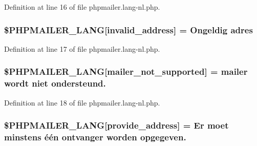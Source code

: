 Definition at line 16 of file phpmailer.\+lang-\/nl.\+php.

\subsubsection[{\texorpdfstring{\$\+P\+H\+P\+M\+A\+I\+L\+E\+R\+\_\+\+L\+A\+NG}{$PHPMAILER_LANG}}]{\setlength{\rightskip}{0pt plus 5cm}\$P\+H\+P\+M\+A\+I\+L\+E\+R\+\_\+\+L\+A\+NG\mbox{[}\textquotesingle{}invalid\+\_\+address\textquotesingle{}\mbox{]} = \textquotesingle{}Ongeldig adres\textquotesingle{}}\hypertarget{phpmailer_8lang-nl_8php_a42d61bcea4c79599ecb44fd062f54d47}{}\label{phpmailer_8lang-nl_8php_a42d61bcea4c79599ecb44fd062f54d47}


Definition at line 17 of file phpmailer.\+lang-\/nl.\+php.

\subsubsection[{\texorpdfstring{\$\+P\+H\+P\+M\+A\+I\+L\+E\+R\+\_\+\+L\+A\+NG}{$PHPMAILER_LANG}}]{\setlength{\rightskip}{0pt plus 5cm}\$P\+H\+P\+M\+A\+I\+L\+E\+R\+\_\+\+L\+A\+NG\mbox{[}\textquotesingle{}mailer\+\_\+not\+\_\+supported\textquotesingle{}\mbox{]} = \textquotesingle{} mailer wordt niet ondersteund.\textquotesingle{}}\hypertarget{phpmailer_8lang-nl_8php_aa2ebcb8833ee83a7ad67401c4bb3a6ad}{}\label{phpmailer_8lang-nl_8php_aa2ebcb8833ee83a7ad67401c4bb3a6ad}


Definition at line 18 of file phpmailer.\+lang-\/nl.\+php.

\subsubsection[{\texorpdfstring{\$\+P\+H\+P\+M\+A\+I\+L\+E\+R\+\_\+\+L\+A\+NG}{$PHPMAILER_LANG}}]{\setlength{\rightskip}{0pt plus 5cm}\$P\+H\+P\+M\+A\+I\+L\+E\+R\+\_\+\+L\+A\+NG\mbox{[}\textquotesingle{}provide\+\_\+address\textquotesingle{}\mbox{]} = \textquotesingle{}Er moet minstens één ontvanger worden opgegeven.\textquotesingle{}}\hypertarget{phpmailer_8lang-nl_8php_a8b97897c2406b7392b056f375feeefbb}{}\label{phpmailer_8lang-nl_8php_a8b97897c2406b7392b056f375feeefbb}



